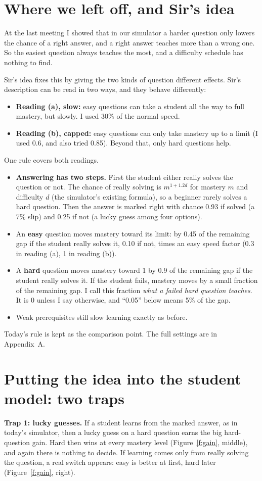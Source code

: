 \documentclass[11pt,a4paper]{article}
\newcommand{\pc}{\%}
\begin{document}
\section{Where we left off, and Sir's idea}
At the last meeting I showed that in our simulator a harder question only lowers the chance of a right answer, and a right answer teaches more than a wrong one. So the easiest question always teaches the most, and a difficulty schedule has nothing to find.

Sir's idea fixes this by giving the two kinds of question different effects. Sir's description can be read in two ways, and they behave differently:
\begin{itemize}[leftmargin=*]
\item \textbf{Reading (a), slow:} easy questions can take a student all the way to full mastery, but slowly. I used 30\pc{} of the normal speed.
\item \textbf{Reading (b), capped:} easy questions can only take mastery up to a limit (I used 0.6, and also tried 0.85). Beyond that, only hard questions help.
\end{itemize}
One rule covers both readings.
\begin{itemize}[leftmargin=*]
\item \textbf{Answering has two steps.} First the student either really solves the question or not. The chance of really solving is $m^{1+1.2d}$ for mastery $m$ and difficulty $d$ (the simulator's existing formula), so a beginner rarely solves a hard question. Then the answer is marked right with chance 0.93 if solved (a 7\pc{} slip) and 0.25 if not (a lucky guess among four options).
\item An \textbf{easy} question moves mastery toward its limit: by 0.45 of the remaining gap if the student really solves it, 0.10 if not, times an easy speed factor (0.3 in reading (a), 1 in reading (b)).
\item A \textbf{hard} question moves mastery toward 1 by 0.9 of the remaining gap if the student really solves it. If the student fails, mastery moves by a small fraction of the remaining gap. I call this fraction \emph{what a failed hard question teaches}. It is 0 unless I say otherwise, and ``0.05'' below means 5\pc{} of the gap.
\item Weak prerequisites still slow learning exactly as before.
\end{itemize}
Today's rule is kept as the comparison point. The full settings are in Appendix~A.

\section{Putting the idea into the student model: two traps}
\textbf{Trap 1: lucky guesses.} If a student learns from the marked answer, as in today's simulator, then a lucky guess on a hard question earns the big hard-question gain. Hard then wins at every mastery level (Figure~\ref{f:gain}, middle), and again there is nothing to decide. If learning comes only from really solving the question, a real switch appears: easy is better at first, hard later (Figure~\ref{f:gain}, right).
\end{document}
